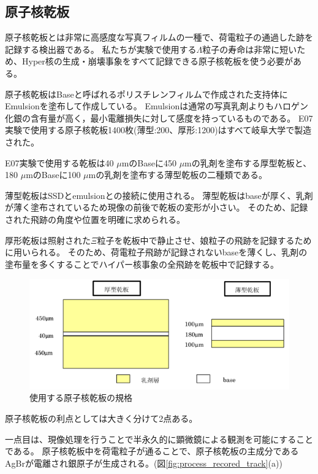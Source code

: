 \documentclass[12pt,a4paper]{jarticle}
\begin{document}
\subsection{原子核乾板}
原子核乾板とは非常に高感度な写真フィルムの一種で、荷電粒子の通過した跡を記録する検出器である。
私たちが実験で使用する$\Lambda$粒子の寿命は非常に短いため、Hyper核の生成・崩壊事象をすべて記録できる原子核乾板を使う必要がある。
\par
原子核乾板はBaseと呼ばれるポリスチレンフィルムで作成された支持体にEmulsionを塗布して作成している。
Emulsionは通常の写真乳剤よりもハロゲン化銀の含有量が高く，最小電離損失に対して感度を持っているものである。
E07実験で使用する原子核乾板1400枚(薄型:200、厚形:1200)はすべて岐阜大学で製造された。
\par
E07実験で使用する乾板は40 $\mu$mのBaseに450 $\mu$mの乳剤を塗布する厚型乾板と、180 $\mu$mのBaseに100 $\mu$mの乳剤を塗布する薄型乾板の二種類である。
\par
薄型乾板はSSDとemulsionとの接続に使用される。
薄型乾板はbaseが厚く、乳剤が薄く塗布されているため現像の前後で乾板の変形が小さい。
そのため、記録された飛跡の角度や位置を明確に求められる。
\par
厚形乾板は照射された$\Xi$粒子を乾板中で静止させ、娘粒子の飛跡を記録するために用いられる。
そのため、荷電粒子飛跡が記録されないbaseを薄くし、乳剤の塗布量を多くすることでハイパー核事象の全飛跡を乾板中で記録する。
\par
\begin{figure}[htbp]
  \centering
     \includegraphics[width=140mm]{emulsionorder.png}
  \caption{使用する原子核乾板の規格\label{fig:emulsionorder}}
\end{figure}
\par
\newpage
原子核乾板の利点としては大きく分けて2点ある。
\par
一点目は、現像処理を行うことで半永久的に顕微鏡による観測を可能にすることである。
原子核乾板中を荷電粒子が通ることで、原子核乾板の主成分であるAgBrが電離され銀原子が生成される。(図\ref{fig:process_recored_track}(a))
\end{document}
